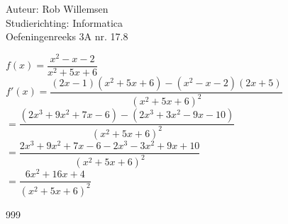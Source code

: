 \documentclass[a4paper]{article}
\begin{document}
\noindent \large Auteur: Rob Willemsen \\
\noindent \large Studierichting: Informatica\\
\noindent \large Oefeningenreeks 3A nr. 17.8\\

\medskip

\normalsize

$f(x) = \dfrac{x^2 - x - 2}{x^2 + 5x + 6}$ \\

$f'(x) = \dfrac{(2x - 1)(x^2 + 5x + 6) - (x^2 - x - 2)(2x + 5)}{(x^2 + 5x + 6)^2}$ \\

$= \dfrac{(2x^3 + 9x^2 + 7x - 6) - (2x^3 + 3x^2 - 9x - 10)}{(x^2 + 5x + 6)^2}$ \\

$= \dfrac{2x^3 + 9x^2 + 7x - 6 - 2x^3 - 3x^2 + 9x + 10}{(x^2 + 5x + 6)^2}$ \\

$= \dfrac{6x^2 + 16x + 4}{(x^2 + 5x + 6)^2}$ \\


\begin{thebibliography}{999}
\end{thebibliography}
\end{document}
